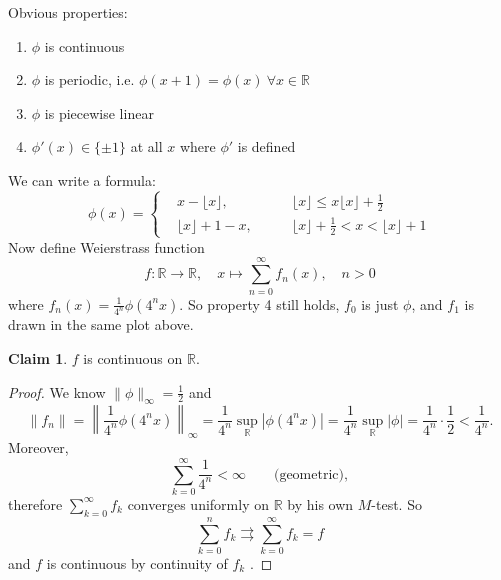 \documentclass[a4paper]{article}
\theoremstyle{definition}
\newtheorem*{claim}{Claim}
\begin{document}
Obvious properties:
\begin{enumerate}
    \item $\phi$ is continuous
    \item $\phi$ is periodic, i.e. $\phi(x+1)=\phi(x) \ \forall x\in \mathbb R$
    \item $\phi$ is piecewise linear
    \item $\phi'(x) \in \{\pm 1\}$ at all $x$ where $\phi'$ is defined
\end{enumerate}
We can write a formula:
\[
\phi(x) = \left\{\begin{aligned}
&x-\lfloor x \rfloor, \qquad &\lfloor x \rfloor \leq x \lfloor x \rfloor+\frac12 \\
&\lfloor x \rfloor +1-x,\qquad &\lfloor x \rfloor+\frac12 <x<\lfloor x \rfloor+1
\end{aligned} \right.
\]
Now define Weierstrass function
\[
f:\mathbb R \rightarrow \mathbb R,\quad x\mapsto \sum_{n=0}^\infty f_n(x),\quad n>0
\]
where $\displaystyle f_n(x) = \frac{1}{4^n} \phi (4^n x)$. So property 4 still holds, $f_0$ is just $\phi$, and $f_1$ is drawn in the same plot above.

\begin{claim}
$f$ is continuous on $\mathbb R$.
\end{claim}
\begin{proof}
We know $\|\phi\|_\infty =\frac12$ and
\[
\|f_n\| = \left\| \frac{1}{4^n} \phi (4^n x) \right\|_\infty = \frac{1}{4^n} \underset{\mathbb R}{\sup} \left| \phi (4^n x) \right| = \frac{1}{4^n} \underset{\mathbb R}{\sup} |\phi| = \frac{1}{4^n}\cdot \frac12 < \frac{1}{4^n}.
\]
Moreover,
\[
\sum_{k=0}^\infty \frac{1}{4^n} < \infty \qquad \text{(geometric)},
\]
therefore $\sum_{k=0}^\infty f_k$ converges uniformly on $\mathbb R$ by his own $M$-test. So
\[
\sum_{k=0}^n f_k \rightrightarrows \sum_{k=0}^\infty f_k = f
\]
and $f$ is continuous by continuity of $f_k$ .
\end{proof}
\end{document}
